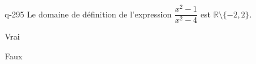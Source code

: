 \begin{truefalse}{q-295}
Le domaine de définition de l'expression $\dfrac{x^2-1}{x^2-4}$ est $\mathbb R \setminus \{-2,2\}$.
\item* Vrai
\item Faux
\end{truefalse}

